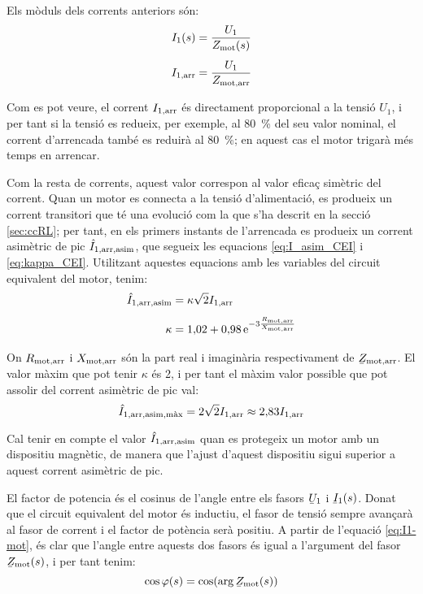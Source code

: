 Els mòduls dels corrents anteriors són:
\begin{subequations}
\begin{align}
    I_1(s) &= \frac{U_1}{Z_\mathrm{mot}(s)} \label{eq:mot-I1}\\[1ex]
    I_\mathrm{1,arr} &= \frac{U_1}{Z_\mathrm{mot,arr}}\label{eq:mot-Iarr}
\end{align}
\end{subequations}

Com es pot veure, el corrent $I_\mathrm{1,arr}$ és directament proporcional a la tensió $U_1$, i per tant si la tensió es redueix, per exemple, al \SI{80}{\%} del seu valor nominal, el corrent d'arrencada també es reduirà al \SI{80}{\%}; en aquest cas el motor trigarà més temps en arrencar.

Com la resta de corrents, aquest valor correspon al valor eficaç simètric del corrent. Quan un motor es connecta a la tensió d'alimentació, es produeix un corrent transitori que té una evolució com la que s'ha descrit en la secció \vref{sec:ccRL}; per tant, en els primers instants de l'arrencada es produeix un corrent asimètric de pic $\hat{I}_\mathrm{1,arr,asim}$, que segueix les equacions \eqref{eq:I_asim_CEI} i \eqref{eq:kappa_CEI}. Utilitzant aquestes equacions amb les variables del circuit equivalent del motor, tenim:
\begin{subequations}
\begin{align}
    \hat{I}_\mathrm{1,arr,asim} &= \kappa \sqrt{2} I_\mathrm{1,arr}  \\[1ex]
    \kappa &= 1{,}02 + 0{,}98 \,\mathrm{e}^{-3\frac{R_\mathrm{mot,arr}}{X_\mathrm{mot,arr}}}
\end{align}
\end{subequations}

On $R_\mathrm{mot,arr}$ i $X_\mathrm{mot,arr}$ són la part real i imaginària respectivament de $\cmplx{Z}\ped{mot,arr}$. El valor màxim que pot tenir  $\kappa$ és 2, i per tant el màxim valor possible que pot assolir del corrent asimètric de pic val:
\begin{equation}
	\hat{I}_\mathrm{1,arr,asim,\text{màx}} =  2\sqrt{2} I_\mathrm{1,arr} \approx 2{,}83 I_\mathrm{1,arr} 
\end{equation}

Cal tenir en compte el valor $\hat{I}_\mathrm{1,arr,asim}$ quan es protegeix un motor amb un dispositiu magnètic, de manera que l'ajust d'aquest dispositiu sigui superior a aquest corrent asimètric de  pic.

El factor de potencia és el cosinus de l'angle entre els fasors $\cmplx{U}_1$ i $\cmplx{I}_1(s)$. Donat que el circuit equivalent del motor és inductiu, el fasor de tensió sempre avançarà al fasor de corrent i el factor de potència serà positiu. A partir de l'equació \eqref{eq:I1-mot}, és clar que l'angle entre aquests dos fasors és igual a l'argument del fasor $\cmplx{Z}\ped{mot}(s)$, i per tant tenim:
\begin{equation}\index{motors d'inducció!factor de potència}
	\cos\varphi(s) = \cos(\arg\cmplx{Z}\ped{mot}(s))\label{eq:cos-fi-mot}
\end{equation}

